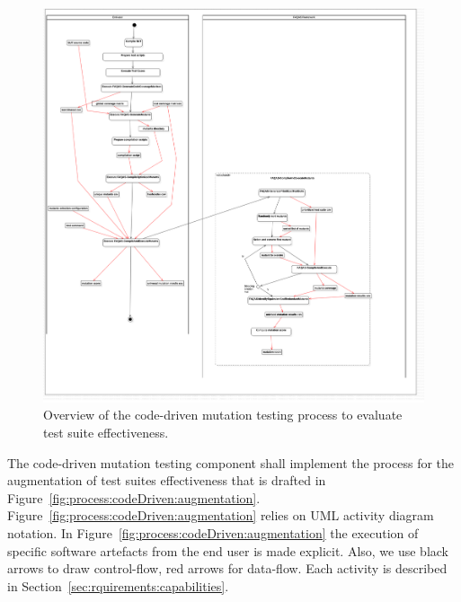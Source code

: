 \begin{figure}[h]
  \centering
	\includegraphics[width=15cm]{images/png/Activity1!CodeDrivenTestSuiteEvaluation_1.png}
      \caption{Overview of the code-driven mutation testing process to evaluate test suite effectiveness.}
      \label{fig:process:codeDriven:evaluation}
\end{figure}


\RQ{} The code-driven mutation testing component shall implement the process for the augmentation of test suites effectiveness that is drafted in Figure~\ref{fig:process:codeDriven:augmentation}. Figure~\ref{fig:process:codeDriven:augmentation} relies on UML activity diagram notation. In Figure~\ref{fig:process:codeDriven:augmentation} the execution of specific software artefacts from the end user is made explicit. Also, we use black arrows to draw control-flow, red arrows for data-flow. Each activity is described in Section~\ref{sec:rquirements:capabilities}.

